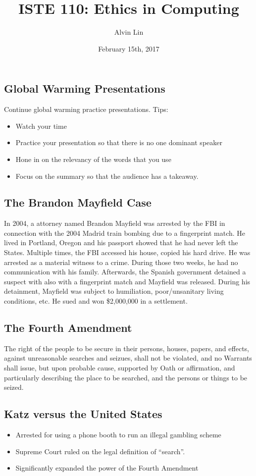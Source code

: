 \documentclass{article}
\title{ISTE 110: Ethics in Computing}
\author{Alvin Lin}
\date{February 15th, 2017}
\begin{document}
\maketitle

\subsection*{Global Warming Presentations}
Continue global warming practice presentations. Tips:
\begin{itemize}
  \item Watch your time
  \item Practice your presentation so that there is no one dominant speaker
  \item Hone in on the relevancy of the words that you use
  \item Focus on the summary so that the audience has a takeaway.
\end{itemize}

\subsection*{The Brandon Mayfield Case}
In 2004, a attorney named Brandon Mayfield was arrested by the FBI in connection
with the 2004 Madrid train bombing due to a fingerprint match. He lived in
Portland, Oregon and his passport showed that he had never left the States.
Multiple times, the FBI accessed his house, copied his hard drive. He was
arrested as a material witness to a crime. During those two weeks, he had no
communication with his family. Afterwards, the Spanish government detained a
suspect with also with a fingerprint match and Mayfield was released. During
his detainment, Mayfield was subject to humiliation, poor/unsanitary living
conditions, etc. He sued and won \$2,000,000 in a settlement.

\subsection*{The Fourth Amendment}
The right of the people to be secure in their persons, houses, papers, and
effects, against unreasonable searches and seizues, shall not be violated, and
no Warrants shall issue, but upon probable cause, supported by Oath or
affirmation, and particularly describing the place to be searched, and the
persons or things to be seized.

\subsection*{Katz versus the United States}
\begin{itemize}
  \item Arrested for using a phone booth to run an illegal gambling scheme
  \item Supreme Court ruled on the legal definition of ``search''.
  \item Significantly expanded the power of the Fourth Amendment
\end{itemize}
\end{document}
